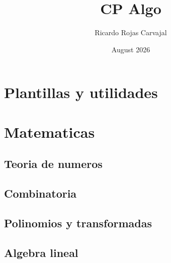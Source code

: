 \documentclass[twocolumn]{article}
\title{CP Algo}
\author{Ricardo Rojas Carvajal}
\date{August 2026}
\begin{document}
	\tableofcontents
	\clearpage

	\section{Plantillas y utilidades}
	
	
	
%	
	

	\section{Matematicas}
	\subsection{Teoria de numeros}
	
	
		
	
	
	
	
	
	
	
	
	

	\subsection{Combinatoria}
	
	
	
	
	

	\subsection{Polinomios y transformadas}
	
	
	
	

	\subsection{Algebra lineal}
	
	
\end{document}
